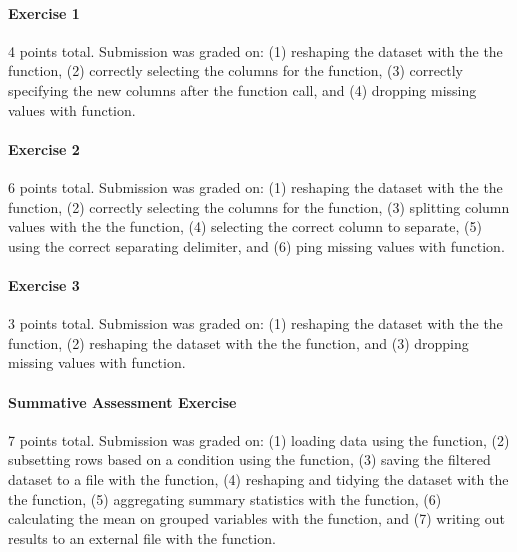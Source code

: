 \documentclass[040-assessment.tex]{subfiles}
\begin{document}
    \paragraph{Exercise 1}

        4 points total.
        Submission was graded on:
        (1) reshaping the dataset with the the  function,
        (2) correctly selecting the columns for the  function,
        (3) correctly specifying the new columns after the  function call, and
        (4) dropping missing values with  function.

    \paragraph{Exercise 2}

        6 points total.
        Submission was graded on:
        (1) reshaping the dataset with the the  function,
        (2) correctly selecting the columns for the  function,
        (3) splitting column values with the the  function,
        (4) selecting the correct column to separate,
        (5) using the correct separating delimiter, and
        (6) ping missing values with  function.

    \paragraph{Exercise 3}

        3 points total.
        Submission was graded on:
        (1) reshaping the dataset with the the  function,
        (2) reshaping the dataset with the the  function, and
        (3) dropping missing values with  function.

    \paragraph{Summative Assessment Exercise}

        7 points total.
        Submission was graded on:
        (1) loading data using the  function,
        (2) subsetting rows based on a condition using the  function,
        (3) saving the filtered dataset to a file with the  function,
        (4) reshaping and tidying the dataset with the the  function,
        (5) aggregating summary statistics with the  function,
        (6) calculating the mean on grouped variables with the  function, and
        (7) writing out results to an external file with the  function.
\end{document}
